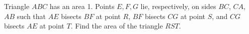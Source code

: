 Triangle $ABC$ has an area 1.  Points $E,F,G$ lie, respectively,
on sides $BC$, $CA$, $AB$ such that $AE$ bisects $BF$ at point $R$,
$BF$ bisects $CG$ at point $S$, and $CG$ bisects $AE$ at point $T$.
Find the area of the triangle $RST$.
